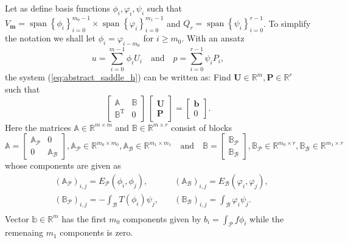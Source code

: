 \documentclass[a4paper,10pt]{article}
\newcommand{\R}{\ensuremath{\mathbb{R}}}
\newcommand{\mm}{\ensuremath{\mathbf{m}}}
\newcommand{\Ep}{\ensuremath{E_{\mathcal{P}}}}
\newcommand{\Eb}{\ensuremath{E_{\mathcal{B}}}}
\newcommand{\Ap}{\ensuremath{\mathbb{A}_{\mathcal{P}}}}
\newcommand{\Ab}{\ensuremath{\mathbb{A}_{\mathcal{B}}}}
\newcommand{\Bp}{\ensuremath{\mathbb{B}_{\mathcal{P}}}}
\newcommand{\Bb}{\ensuremath{\mathbb{B}_{\mathcal{B}}}}
\newcommand{\Amat}{\ensuremath{\mathbb{A}}}
\newcommand{\Bmat}{\ensuremath{\mathbb{B}}}
\newcommand{\Apij}[2]{\ensuremath{\left(\mathbb{A}_{\mathcal{P}}\right)_{#1, #2}}}
\newcommand{\Abij}[2]{\ensuremath{\left(\mathbb{A}_{\mathcal{B}}\right)_{#1, #2}}}
\newcommand{\Bpij}[2]{\ensuremath{\left(\mathbb{B}_{\mathcal{P}}\right)_{#1, #2}}}
\newcommand{\Bbij}[2]{\ensuremath{\left(\mathbb{B}_{\mathcal{B}}\right)_{#1, #2}}}
\DeclareMathOperator{\spn}{span}
\begin{document}
  Let as define basis functions $\phi_i, \varphi_i, \psi_i$ such that
  $V_{\mm}=\spn\left\{\phi_i\right\}_{i=0}^{m_0-1} \times
  \spn\left\{\varphi_i\right\}_{i=0}^{m_1-1}$ and $Q_r=\spn\left\{\psi_i\right\}_{i=0}^{r-1}$.
  To simplify the notation we shall let $\phi_i=\varphi_{i-m_0}$ for $i\geq
  m_0$. With an ansatz 
  \[ u=\displaystyle\sum\limits_{i=0}^{m-1}\phi_i U_i
    \quad\text{and}\quad
  p=\displaystyle\sum\limits_{i=0}^{r-1}\psi_i P_i,
  \]
  the system (\ref{eq:abstract_saddle_h}) can be written as: Find
  $\mathbf{U}\in\R^m, \mathbf{P}\in\R^r$ such that
  \begin{equation}
    \label{system}
    \begin{bmatrix}
      \mathbb{A} & \mathbb{B} \\
      \mathbb{B}^{\text{T}} & 0
    \end{bmatrix}
    \,
    \begin{bmatrix}
      \mathbf{U} \\
      \mathbf{P}
    \end{bmatrix}
    =
    \begin{bmatrix}
      \mathbf{b}\\
      0
    \end{bmatrix}.
  \end{equation}
  Here the matrices $\mathbb{A}\in\R^{m\times m}$ and $\mathbb{B}\in\R^{m\times
  r}$ consist of blocks
  \[
    \Amat = 
    \begin{bmatrix}
      \Ap & 0\\
      0 & \Ab
    \end{bmatrix}
    ,\Ap\in\R^{m_0\times m_0}, \Ab\in\R^{m_1\times m_1}
    \quad
    \text{and}
    \quad
    \Bmat = 
    \begin{bmatrix}
      \Bp \\
      \Bb
    \end{bmatrix}
    ,\Bp\in\R^{m_0\times r}, \Bb\in\R^{m_1\times r}
  \]
  whose components are given as
  \[
  \begin{aligned}
    &\Apij{i}{j} = \Ep(\phi_i,
    \phi_j),\quad&\Abij{i}{j}=\Eb(\varphi_i,\varphi_j),\\
    &\Bpij{i}{j} =
    -\int_\mathcal{B}T(\phi_i)\psi_j,\quad&\Bbij{i}{j}=\int_\mathcal{B}\varphi_i\psi_j.\\
  \end{aligned}
  \]
  Vector $\mathbb{b}\in\R^{m}$ has the first $m_0$ components given by
  $b_i=\int_\mathcal{P}f\phi_i$ while the remenaing $m_1$ components is zero.
\end{document}
